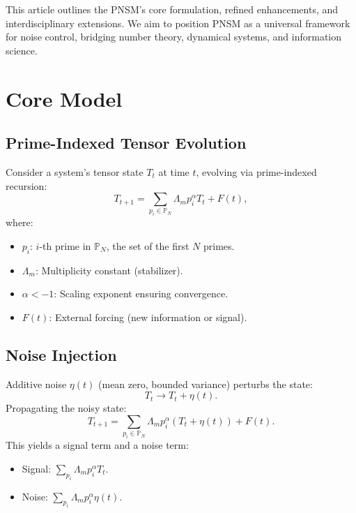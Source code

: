 \documentclass{article}
\theoremstyle{plain}
\begin{document}
This article outlines the PNSM’s core formulation, refined enhancements, and interdisciplinary extensions. We aim to position PNSM as a universal framework for noise control, bridging number theory, dynamical systems, and information science.

\section{Core Model}
\subsection{Prime-Indexed Tensor Evolution}
Consider a system’s tensor state \( T_t \) at time \( t \), evolving via prime-indexed recursion:
\begin{equation}
    T_{t+1} = \sum_{p_i \in \mathbb{P}_N} \Lambda_m p_i^\alpha T_t + F(t),
\end{equation}
where:
\begin{itemize}
    \item \( p_i \): \( i \)-th prime in \( \mathbb{P}_N \), the set of the first \( N \) primes.
    \item \( \Lambda_m \): Multiplicity constant (stabilizer).
    \item \( \alpha < -1 \): Scaling exponent ensuring convergence.
    \item \( F(t) \): External forcing (new information or signal).
\end{itemize}

\subsection{Noise Injection}
Additive noise \( \eta(t) \) (mean zero, bounded variance) perturbs the state:
\begin{equation}
    T_t \to T_t + \eta(t).
\end{equation}
Propagating the noisy state:
\begin{equation}
    T_{t+1} = \sum_{p_i \in \mathbb{P}_N} \Lambda_m p_i^\alpha (T_t + \eta(t)) + F(t).
\end{equation}
This yields a signal term and a noise term:
\begin{itemize}
    \item Signal: \( \sum_{p_i} \Lambda_m p_i^\alpha T_t \).
    \item Noise: \( \sum_{p_i} \Lambda_m p_i^\alpha \eta(t) \).
\end{itemize}
\end{document}

